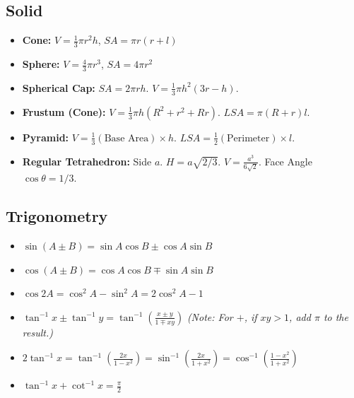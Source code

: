 \subsection{Solid}
\begin{itemize}[leftmargin=*]
    \item \textbf{Cone:} $V=\frac{1}{3}\pi r^2 h$, $SA = \pi r(r+l)$
    \item \textbf{Sphere:} $V=\frac{4}{3}\pi r^3$, $SA = 4\pi r^2$
    \item \textbf{Spherical Cap:} $SA = 2\pi r h$. $V = \frac{1}{3}\pi h^2(3r-h)$.
    \item \textbf{Frustum (Cone):} $V = \frac{1}{3}\pi h (R^2 + r^2 + Rr)$. $LSA = \pi(R+r)l$.
    \item \textbf{Pyramid:} $V = \frac{1}{3} (\text{Base Area}) \times h$. $LSA = \frac{1}{2} (\text{Perimeter}) \times l$.
    \item \textbf{Regular Tetrahedron:} Side $a$. $H = a\sqrt{2/3}$. $V = \frac{a^3}{6\sqrt{2}}$. Face Angle $\cos\theta = 1/3$.
\end{itemize}
\subsection{Trigonometry}
\begin{itemize}[leftmargin=*]
    \item $\sin(A\pm B) = \sin A\cos B \pm \cos A\sin B$
    \item $\cos(A\pm B) = \cos A\cos B \mp \sin A\sin B$
    \item $\cos 2A = \cos^2 A - \sin^2 A = 2\cos^2 A - 1$
    \item $\tan^{-1}x \pm \tan^{-1}y = \tan^{-1}\left( \frac{x \pm y}{1 \mp xy} \right)$
    \textit{(Note: For $+$, if $xy > 1$, add $\pi$ to the result.)}
    \item $2\tan^{-1}x = \tan^{-1}\left(\frac{2x}{1-x^2}\right) = \sin^{-1}\left(\frac{2x}{1+x^2}\right) = \cos^{-1}\left(\frac{1-x^2}{1+x^2}\right)$
    \item $\tan^{-1}x + \cot^{-1}x = \frac{\pi}{2}$
\end{itemize}
